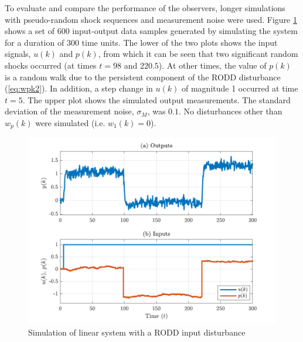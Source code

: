 To evaluate and compare the performance of the observers, longer simulations with pseudo-random shock sequences and measurement noise were used. Figure \ref{fig:rod-obs-sim1-ioplot} shows a set of 600 input-output data samples generated by simulating the system for a duration of 300 time units. The lower of the two plots shows the input signals, $u(k)$ and $p(k)$, from which it can be seen that two significant random shocks occurred (at times $t=98$ and $220.5$). At other times, the value of $p(k)$ is a random walk due to the persistent component of the RODD disturbance (\ref{eq:wpk2}). In addition, a step change in $u(k)$ of magnitude 1 occurred at time $t=5$. The upper plot shows the simulated output measurements. The standard deviation of the measurement noise, $\sigma_M$, was $0.1$. No disturbances other than $w_p(k)$ were simulated (i.e. $w_1(k)=0$). 
\begin{figure}[htp]
	\centering
	\includegraphics[width=14cm]{images/rod_obs_sim1_ioplot.pdf}
	\caption{Simulation of linear system with a RODD input disturbance}
	\label{fig:rod-obs-sim1-ioplot}
\end{figure}

